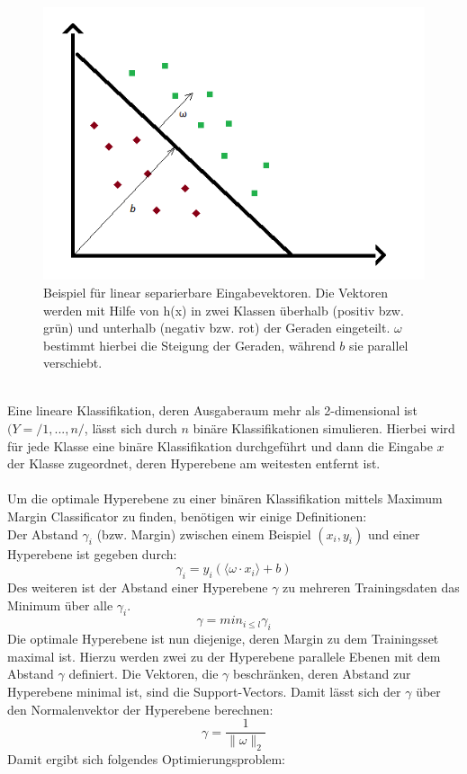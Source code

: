 \begin{figure}[hbtp]
\includegraphics[width=0.7\linewidth]{LinSeparabel.png}
\centering
\caption{Beispiel für linear separierbare Eingabevektoren. Die Vektoren werden mit Hilfe von h(x) in zwei Klassen überhalb (positiv bzw. grün) und unterhalb (negativ bzw. rot) der Geraden eingeteilt. $\omega$ bestimmt hierbei die Steigung der Geraden, während $b$ sie parallel verschiebt.}
\label{fig:LinSeparabel}
\end{figure}\ \\
Eine lineare Klassifikation, deren Ausgaberaum mehr als 2-dimensional ist $(Y = /{1,...,n/}$, lässt sich durch $n$ binäre Klassifikationen simulieren. Hierbei wird für jede Klasse eine binäre Klassifikation durchgeführt und dann die Eingabe $x$ der Klasse zugeordnet, deren Hyperebene am weitesten entfernt ist.\\ \\
Um die optimale Hyperebene zu einer binären Klassifikation mittels \glqq{}Maximum Margin Classificator\grqq{} zu finden, benötigen wir einige Definitionen: \\
 Der Abstand $\gamma_{i}$ (bzw. Margin) zwischen einem Beispiel $(x_{i},y_{i})$ und einer Hyperebene ist gegeben durch:
\[ \gamma_{i} = y_{i}(\langle \omega \cdot x_{i} \rangle + b )\]
Des weiteren ist der Abstand einer Hyperebene $\gamma$ zu mehreren Trainingsdaten das Minimum über alle $\gamma_{i}$.
\[\gamma = min_{i\leq l} \gamma_{i}\]
Die optimale Hyperebene ist nun diejenige, deren Margin zu dem Trainingsset maximal ist. Hierzu werden zwei zu der Hyperebene parallele Ebenen mit dem Abstand $\gamma$ definiert. Die Vektoren, die $\gamma$ beschränken, deren Abstand zur Hyperebene minimal ist, sind die \glqq{}Support-Vectors\grqq{}. Damit lässt sich der $\gamma$ über den Normalenvektor der Hyperebene berechnen:
\[\gamma = \frac{1}{\lVert \omega \rVert_{2}} \]
Damit ergibt sich folgendes Optimierungsproblem:\\

